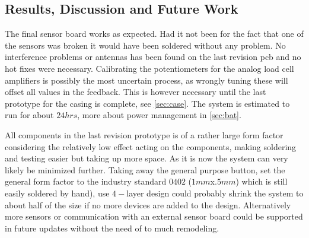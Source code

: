 \subsection{Results, Discussion and Future Work}\label{sec:hw:tip2}
The final sensor board works as expected. Had it not been for the fact that one of the sensors was broken it would have been soldered without any problem. No interference problems or antennas has been found on the last revision \gls{pcb} and no hot fixes were necessary.
Calibrating the potentiometers for the analog load cell amplifiers is possibly the most uncertain process, as wrongly tuning these will offset all values in the feedback. This is however necessary until the last prototype for the casing is complete, see \autoref{sec:case}.
The system is estimated to run for about $24hrs$, more about power management in \autoref{sec:bat}. 

All components in the last revision prototype is of a rather large form factor considering the relatively low effect acting on the components, making soldering and testing easier but taking up more space. As it is now the system can very likely be minimized further. Taking away the general purpose button, set the general form factor to the industry standard $0402$ ($1mm$x$.5mm$) which is still easily soldered by hand), use $4-$layer design could probably shrink the system to about half of the size if no more devices are added to the design. Alternatively more sensors or communication with an external sensor board could be supported in future updates without the need of to much remodeling. 